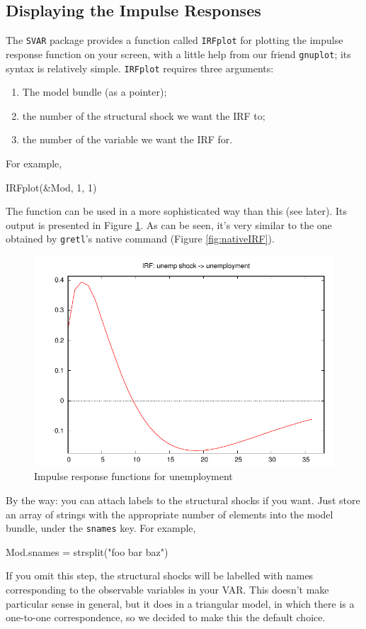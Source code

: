 \documentclass[a4paper,10pt]{article}
\begin{document}
\subsection{Displaying the Impulse Responses}
\label{sec:IRF-FEVD}

The \texttt{SVAR} package provides a function called \texttt{IRFplot}
for plotting the impulse response function on your screen, with a
little help from our friend \texttt{gnuplot}; its syntax is relatively
simple. \texttt{IRFplot} requires three arguments:
\begin{enumerate}
\item The model bundle (as a pointer);
\item the number of the structural shock we want the IRF to;
\item the number of the variable we want the IRF for.
\end{enumerate}
For example,
\begin{code}
  IRFplot(&Mod, 1, 1)
\end{code}

The function can be used in a more sophisticated way than this (see
later). Its output is presented in Figure
\ref{fig:simpleC-noboot.IRF}. As can be seen, it's very similar to the
one obtained by \texttt{gretl}'s native command (Figure
\ref{fig:nativeIRF}).

\begin{figure}[htbp]
  \centering
    \includegraphics[scale=0.7]{simpleC_11_noboot}
  \caption{Impulse response functions for unemployment}
  \label{fig:simpleC-noboot.IRF}
\end{figure}

By the way: you can attach labels to the structural shocks if you
want. Just store an array of strings with the appropriate number of
elements into the model bundle, under the \texttt{snames} key. For
example,
\begin{code}
  Mod.snames = strsplit("foo bar baz")
\end{code}
If you omit this step, the structural shocks will be labelled with
names corresponding to the observable variables in your VAR. This
doesn't make particular sense in general, but it does in a triangular
model, in which there is a one-to-one correspondence, so we decided to
make this the default choice.
\end{document}
